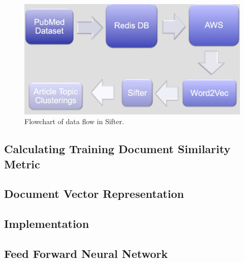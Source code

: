 \documentclass[12pt,twoside]{article}
\begin{document}
\begin{figure}[h]
\centering
\includegraphics[width=1.0\textwidth]{figures/approach.jpg}
\caption{Flowchart of data flow in Sifter.}
\label{fig:tested_model}
\end{figure}


\subsection{Calculating Training Document Similarity Metric}

\subsection{Document Vector Representation}

\subsection{Implementation}

\subsection{Feed Forward Neural Network}
\end{document}
